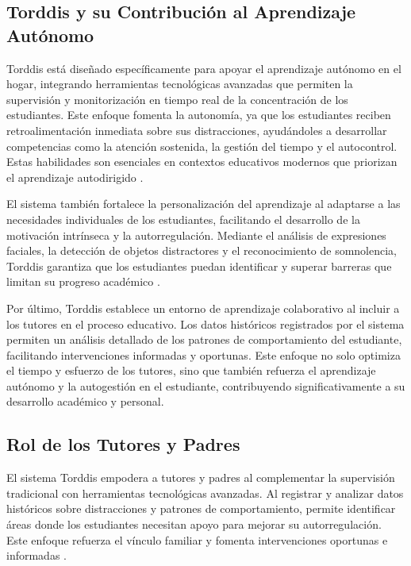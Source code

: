 \documentclass[a4paper,fleqn]{cas-sc}
\begin{document}
		\subsection{Torddis y su Contribución al Aprendizaje Autónomo}
			Torddis está diseñado específicamente para apoyar el aprendizaje autónomo en el hogar, integrando herramientas tecnológicas avanzadas que permiten la supervisión y monitorización en tiempo real de la concentración de los estudiantes. Este enfoque fomenta la autonomía, ya que los estudiantes reciben retroalimentación inmediata sobre sus distracciones, ayudándoles a desarrollar competencias como la atención sostenida, la gestión del tiempo y el autocontrol. Estas habilidades son esenciales en contextos educativos modernos que priorizan el aprendizaje autodirigido \citep{Li2024Systematic}.
		
			El sistema también fortalece la personalización del aprendizaje al adaptarse a las necesidades individuales de los estudiantes, facilitando el desarrollo de la motivación intrínseca y la autorregulación. Mediante el análisis de expresiones faciales, la detección de objetos distractores y el reconocimiento de somnolencia, Torddis garantiza que los estudiantes puedan identificar y superar barreras que limitan su progreso académico \citep{Ackermans2025Young}.
		
			Por último, Torddis establece un entorno de aprendizaje colaborativo al incluir a los tutores en el proceso educativo. Los datos históricos registrados por el sistema permiten un análisis detallado de los patrones de comportamiento del estudiante, facilitando intervenciones informadas y oportunas. Este enfoque no solo optimiza el tiempo y esfuerzo de los tutores, sino que también refuerza el aprendizaje autónomo y la autogestión en el estudiante, contribuyendo significativamente a su desarrollo académico y personal.
		
		\subsection{Rol de los Tutores y Padres}
			El sistema Torddis empodera a tutores y padres al complementar la supervisión tradicional con herramientas tecnológicas avanzadas. Al registrar y analizar datos históricos sobre distracciones y patrones de comportamiento, permite identificar áreas donde los estudiantes necesitan apoyo para mejorar su autorregulación. Este enfoque refuerza el vínculo familiar y fomenta intervenciones oportunas e informadas \citep{Loh2025Plugging}.
		
\end{document}
